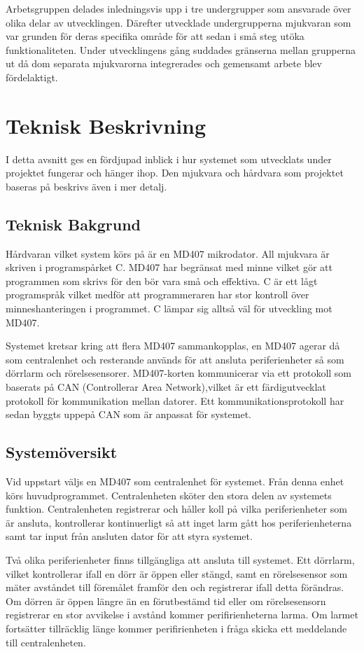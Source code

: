 \documentclass[a4paper]{article}
\begin{document}
Arbetsgruppen delades inledningsvis upp i tre undergrupper som ansvarade över olika delar av utvecklingen. Därefter utvecklade undergrupperna mjukvaran som var grunden för deras specifika område för att sedan i små steg utöka funktionaliteten. Under utvecklingens gång suddades gränserna mellan grupperna ut då dom separata mjukvarorna integrerades och gemensamt arbete blev fördelaktigt.


\section{Teknisk Beskrivning}
I detta avsnitt ges en fördjupad inblick i hur systemet som utvecklats under projektet fungerar och hänger ihop. Den mjukvara och hårdvara som projektet baseras på beskrivs även i mer detalj.

\subsection{Teknisk Bakgrund}
Hårdvaran vilket system körs på är en MD407 mikrodator. All mjukvara är skriven i programspårket C. MD407 har begränsat med minne vilket gör att programmen som skrivs för den bör vara små och effektiva. C är ett lågt programspråk vilket medför att programmeraren har stor kontroll över minneshanteringen i programmet. C lämpar sig alltså väl för utveckling mot MD407.

Systemet kretsar kring att flera MD407 sammankopplas, en MD407 agerar då som centralenhet och resterande används för att ansluta periferienheter så som dörrlarm och rörelsesensorer. MD407-korten kommunicerar via ett protokoll som baserats på CAN (Controllerar Area Network),vilket är ett färdigutvecklat protokoll för kommunikation mellan datorer. Ett kommunikationsprotokoll har sedan byggts uppepå CAN som är anpassat för systemet.

\subsection{Systemöversikt}

Vid uppstart väljs en MD407 som centralenhet för systemet. Från denna enhet körs huvudprogrammet. Centralenheten sköter den stora delen av systemets funktion. Centralenheten registrerar och håller koll på vilka periferienheter som är ansluta, kontrollerar kontinuerligt så att inget larm gått hos periferienheterna samt tar input från ansluten dator för att styra systemet.

Två olika periferienheter finns tillgängliga att ansluta till systemet. Ett dörrlarm, vilket kontrollerar ifall en dörr är öppen eller stängd, samt en rörelsesensor som mäter avståndet till föremålet framför den och registrerar ifall detta förändras. Om dörren är öppen längre än en förutbestämd tid eller om rörelsesensorn registrerar en stor avvikelse i avstånd kommer perifirienheterna larma. Om larmet fortsätter tillräcklig länge kommer perifirienheten i fråga skicka ett meddelande till centralenheten.
\end{document}
